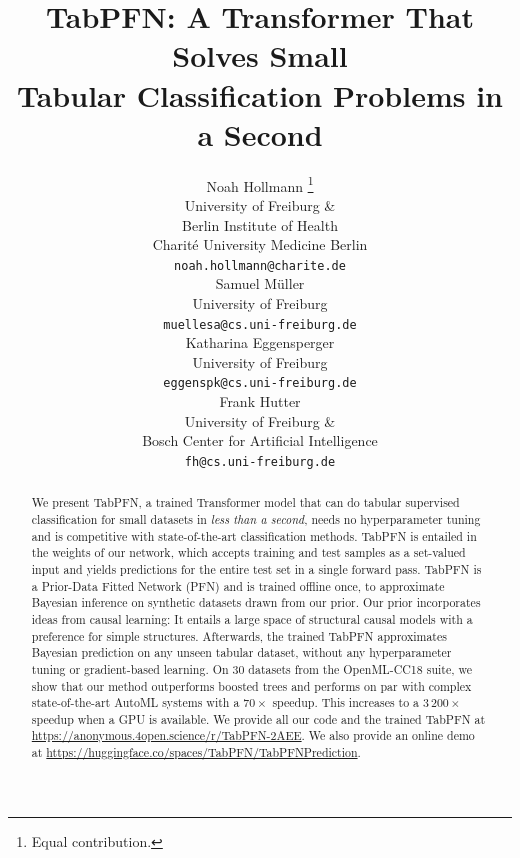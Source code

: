 \documentclass{article}
\title{TabPFN: A Transformer That Solves Small\\Tabular Classification Problems in a Second}
\author{
  Noah Hollmann \thanks{Equal contribution.} \\
  University of Freiburg \&\\
  Berlin Institute of Health \\
  Charit\'e University Medicine Berlin \\
  \texttt{noah.hollmann@charite.de} \\
  \And
  Samuel M\"uller \printfnsymbol{1} \\
  University of Freiburg \\
  \texttt{muellesa@cs.uni-freiburg.de} \\
  \And
  Katharina Eggensperger \\
  University of Freiburg \\
  \texttt{eggenspk@cs.uni-freiburg.de} \\
  \And
  Frank Hutter \\
  University of Freiburg \&\\
  Bosch Center for Artificial Intelligence \\
  \texttt{fh@cs.uni-freiburg.de} \\
}
\begin{document}
\maketitle



\newcommand{\methodname}[0]{TabPFN}
\newcommand{\priortuning}[0]{differentiable hyperparameter tuning}
\newcommand{\openmlcc}[0]{OpenML-CC18}
\newcommand{\openmlautoml}[0]{OpenML-AutoML}
\begin{abstract}
We present \methodname{}, a trained Transformer model that can do tabular supervised classification for small datasets in \textit{less than a second}, needs no hyperparameter tuning and is competitive with state-of-the-art classification methods.
\methodname{} is entailed in the weights of our network, which accepts training and test samples as a set-valued input and yields predictions for the entire test set in a single forward pass.
\methodname{} is a Prior-Data Fitted Network (PFN) and is trained offline once, to approximate Bayesian inference on synthetic datasets drawn from our prior.
Our prior incorporates ideas from causal learning: It entails a large space of structural causal models with a preference for simple structures.
Afterwards, the trained \methodname{} approximates Bayesian prediction on any unseen tabular dataset, without any hyperparameter tuning or gradient-based learning. %
On $30$ datasets from the \openmlcc{} suite, we show that our method outperforms boosted trees and performs on par with complex state-of-the-art AutoML systems with a $70\times$ speedup. %
This increases to a $3\,200\times$ speedup when a GPU is available.
We provide all our code and the trained \methodname{} at \url{https://anonymous.4open.science/r/TabPFN-2AEE}. We also provide an online demo at \url{https://huggingface.co/spaces/TabPFN/TabPFNPrediction}.
\end{abstract}
\end{document}
